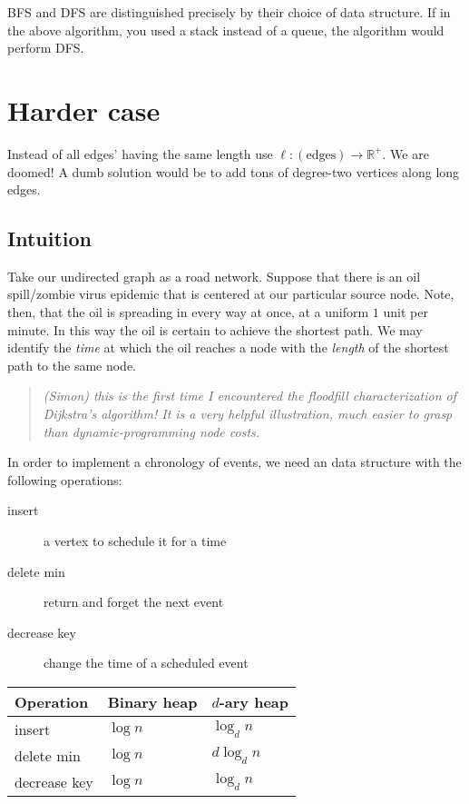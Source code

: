 BFS and DFS are distinguished precisely by their choice of data structure.
If in the above algorithm, you used a stack instead of a queue,
the algorithm would perform DFS.

\section{Harder case}
Instead of all edges' having the same length use \(\ell: \left(\text{edges}\right)\to \mathbb{R}^+\).
We are doomed! A dumb solution would be to add tons of degree-two vertices
along long edges.

\subsection{Intuition}
Take our undirected graph as a road network.
Suppose that there is an oil spill/zombie virus epidemic that is centered at our
particular source node.
Note, then, that the oil is spreading in every way at once, at a uniform
\(1\) unit per minute.
In this way the oil is certain to achieve the shortest path.
We may identify the \emph{time} at which the oil reaches a node with the
\emph{length} of the shortest path to the same node.

\begin{quote}
	\em
	(Simon) this is the first time I encountered the floodfill
	characterization of Dijkstra's algorithm! It is a very helpful illustration,
	much easier to grasp than dynamic-programming node costs.
\end{quote}

In order to implement a chronology of events, we need an data structure with
the following operations:
\begin{description}
	\item[insert] a vertex to schedule it for a time
	\item[delete min] return and forget the next event
	\item[decrease key] change the time of a scheduled event
\end{description}

\begin{tabular}{lll}
	Operation & Binary heap & \(d\)-ary heap \\\hline
	insert & \(\log n\) & \(\log_d n\) \\
	delete min & \(\log n\) & \(d \log_d n\)\\
	decrease key & \(\log n\) & \(\log_d n\)
\end{tabular}

